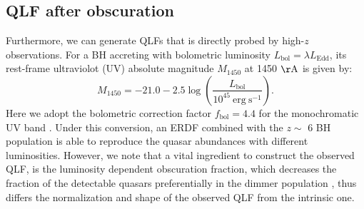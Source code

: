 \documentclass[nolinenumbers,preprint2,tighten]{aastex631}
\newcommand{\Muv}{M_{1450}}
\newcommand{\Lbol}{L_\mathrm{bol}}
\newcommand{\fbol}{f_\mathrm{bol}}
\begin{document}
\begin{CJK*}{UTF8}{gbsn}
\subsection{QLF after obscuration}\label{sec:LF}
Furthermore, we can generate QLFs that is directly probed by high-$z$ observations.
For a BH accreting with bolometric luminosity $\Lbol=\lambda L_\mathrm{Edd}$, 
its rest-frame ultraviolot (UV) absolute magnitude $\Muv$ 
at 1450 $\mathrm{\AA}$ is given by: 
\begin{equation}
  \label{eq:M1450}
  \Muv= -21.0-2.5 \log  \left(\frac{\Lbol}{10^{45}~\mathrm{erg~s}^{-1}} \right).
\end{equation}
Here we adopt the bolometric correction factor $\fbol=4.4$ for the monochromatic UV band \citep{2006ApJS..166..470R}.
Under this conversion, an ERDF combined with the $z\sim$ 6 BH population is able to reproduce 
the quasar abundances with different luminosities. 
However, we note that a vital ingredient to construct the observed QLF, 
is the luminosity dependent obscuration fraction, 
which decreases the fraction of the detectable quasars preferentially in the dimmer population 
\citep{2003ApJ...598..886U,2014ApJ...786..104U,2008A&A...490..905H,2014MNRAS.437.3550M}, 
thus differs the normalization and shape of the observed QLF from the intrinsic one.


\end{CJK*}
\end{document}
